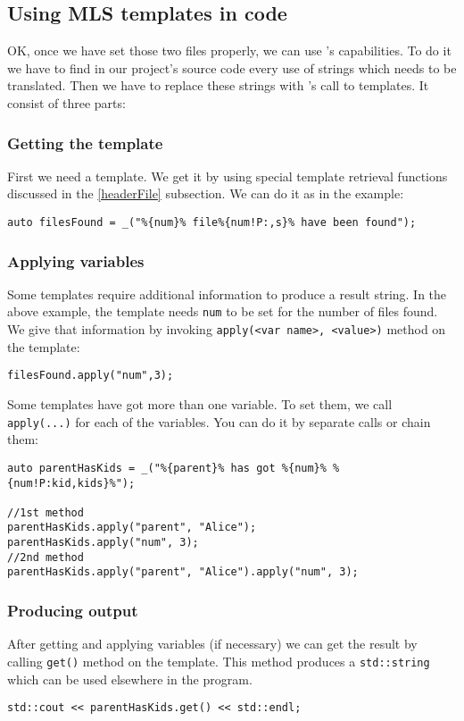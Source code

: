 \subsection{Using MLS templates in code}
OK, once we have set those two files properly, we can use \mulan{}'s capabilities. 
To do it we have to find in our project's source code every use of strings which needs to be translated. 
Then we have to replace these strings with \mulan{}'s call to templates. It consist of three parts:
\subsubsection{Getting the template}
First we need a template. We get it by using special template retrieval functions discussed in the \ref{headerFile} subsection. 
We can do it as in the example:
\begin{verbatim}
auto filesFound = _("%{num}% file%{num!P:,s}% have been found");
\end{verbatim}

\subsubsection{Applying variables}
Some templates require additional information to produce a result string.
In the above example, the template needs \texttt{num} to be set for the number of files found.
We give that information by invoking \verb+apply(<var name>, <value>)+ method on the template:
\begin{verbatim}
filesFound.apply("num",3);
\end{verbatim}
Some templates have got more than one variable. To set them, we call \verb+apply(...)+ for each of the variables.
You can do it by separate calls or chain them:
\begin{verbatim}
auto parentHasKids = _("%{parent}% has got %{num}% %{num!P:kid,kids}%");

//1st method
parentHasKids.apply("parent", "Alice");
parentHasKids.apply("num", 3);
//2nd method
parentHasKids.apply("parent", "Alice").apply("num", 3);
\end{verbatim}

\subsubsection{Producing output}
After getting and applying variables (if necessary) we can get the result by calling \verb+get()+ method on the template.
This method produces a \verb+std::string+ which can be used elsewhere in the program.
\begin{verbatim}
std::cout << parentHasKids.get() << std::endl;
\end{verbatim}

